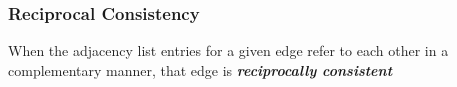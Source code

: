 \begin{frame}
  \frametitle{Reciprocal Consistency}
  \centering
  When the adjacency list entries for a given edge refer to each other in a complementary manner, that edge is \textbf{\emph{reciprocally consistent}}
\end{frame}